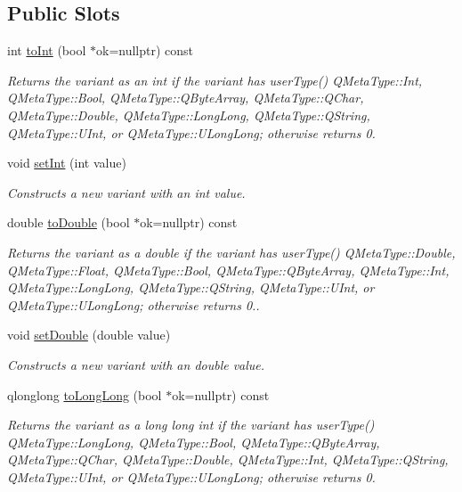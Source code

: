 \subsection*{Public Slots}
\begin{DoxyCompactItemize}
\item 
int \hyperlink{class_variant_ae38d113834d5d53ca9c7f36366a25288}{to\+Int} (bool $\ast$ok=nullptr) const
\begin{DoxyCompactList}\small\item\em Returns the variant as an int if the variant has user\+Type() Q\+Meta\+Type\+::\+Int, Q\+Meta\+Type\+::\+Bool, Q\+Meta\+Type\+::\+Q\+Byte\+Array, Q\+Meta\+Type\+::\+Q\+Char, Q\+Meta\+Type\+::\+Double, Q\+Meta\+Type\+::\+Long\+Long, Q\+Meta\+Type\+::\+Q\+String, Q\+Meta\+Type\+::\+U\+Int, or Q\+Meta\+Type\+::\+U\+Long\+Long; otherwise returns 0. \end{DoxyCompactList}\item 
void \hyperlink{class_variant_aa4fe139cfa2b949c68fd2cc61118dd12}{set\+Int} (int value)
\begin{DoxyCompactList}\small\item\em Constructs a new variant with an int value. \end{DoxyCompactList}\item 
double \hyperlink{class_variant_a543a5e6579cea7fcd8e6413921e8fd44}{to\+Double} (bool $\ast$ok=nullptr) const
\begin{DoxyCompactList}\small\item\em Returns the variant as a double if the variant has user\+Type() Q\+Meta\+Type\+::\+Double, Q\+Meta\+Type\+::\+Float, Q\+Meta\+Type\+::\+Bool, Q\+Meta\+Type\+::\+Q\+Byte\+Array, Q\+Meta\+Type\+::\+Int, Q\+Meta\+Type\+::\+Long\+Long, Q\+Meta\+Type\+::\+Q\+String, Q\+Meta\+Type\+::\+U\+Int, or Q\+Meta\+Type\+::\+U\+Long\+Long; otherwise returns 0.. \end{DoxyCompactList}\item 
void \hyperlink{class_variant_a9cf99c99f688ecafaf0ccfe1fb6aee52}{set\+Double} (double value)
\begin{DoxyCompactList}\small\item\em Constructs a new variant with an double value. \end{DoxyCompactList}\item 
qlonglong \hyperlink{class_variant_ad6c7084a71cb3189d302160a160bb36b}{to\+Long\+Long} (bool $\ast$ok=nullptr) const
\begin{DoxyCompactList}\small\item\em Returns the variant as a long long int if the variant has user\+Type() Q\+Meta\+Type\+::\+Long\+Long, Q\+Meta\+Type\+::\+Bool, Q\+Meta\+Type\+::\+Q\+Byte\+Array, Q\+Meta\+Type\+::\+Q\+Char, Q\+Meta\+Type\+::\+Double, Q\+Meta\+Type\+::\+Int, Q\+Meta\+Type\+::\+Q\+String, Q\+Meta\+Type\+::\+U\+Int, or Q\+Meta\+Type\+::\+U\+Long\+Long; otherwise returns 0. \end{DoxyCompactList}\item 

\end{DoxyCompactItemize}
